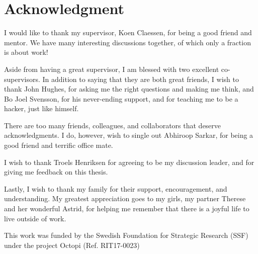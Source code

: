 \chapter*{Acknowledgment}
\vspace{5 mm}

I would like to thank my supervisor, Koen Claessen, for being a good friend and mentor. We have many interesting discussions
together, of which only a fraction is about work!

Aside from having a great supervisor, I am blessed with two excellent co-supervisors. In addition to saying that
they are both great friends, I wish to thank John Hughes, for asking me the right
questions and making me think, and Bo Joel Svensson, for his never-ending support, and for teaching me to be a
hacker, just like himself.

There are too many friends, colleagues, and collaborators that deserve acknowledgments.
I do, however, wish to single out Abhiroop Sarkar, for being a good friend and terrific office mate.

I wish to thank Troels Henriksen for agreeing to be my discussion leader, and for giving me feedback on this thesis.

Lastly, I wish to thank my family for their support, encouragement, and understanding. My greatest appreciation goes to my
girls, my partner Therese and her wonderful Astrid, for helping me remember that there is a joyful life to live outside
of work.

This work was funded by the Swedish Foundation for Strategic Research (SSF) under the project Octopi (Ref. RIT17-0023)